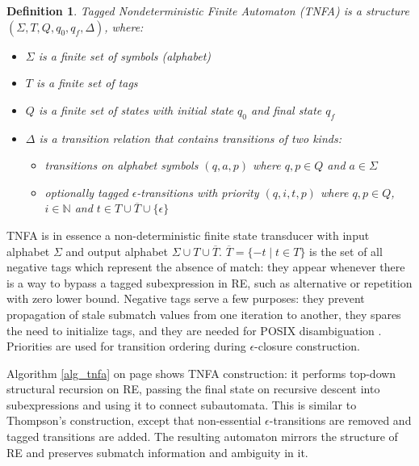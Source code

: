 \documentclass[]{article}
\newtheorem{definition}{Definition}
\newcommand*{\Xbar}[1]{\overline{#1}}
\newcommand{\YN}{\mathbb{N}}
\begin{document}
\begin{definition} \label{def_tnfa}
Tagged Nondeterministic Finite Automaton (TNFA)
is a structure $(\Sigma, T, Q, q_0, q_f, \Delta)$, where:
\begin{itemize}
    \item[] $\Sigma$ is a finite set of symbols (alphabet)
    \item[] $T$ is a finite set of tags
    \item[] $Q$ is a finite set of states with initial state $q_0$ and final state $q_f$
    \item[] $\Delta$ is a transition relation that contains transitions of two kinds:
    \begin{itemize}
        \item[] transitions on alphabet symbols $(q, a, p)$ where $q, p \in Q$ and $a \in \Sigma$
        \item[] optionally tagged $\epsilon$-transitions with priority $(q, i, t, p)$ where $q, p \in Q$, $i \in \YN$ and $t \in T \cup \Xbar{T} \cup \{\epsilon\}$
    \end{itemize}
\end{itemize}
\end{definition}

TNFA is in essence a non-deterministic finite state transducer with input alphabet $\Sigma$ and output alphabet $\Sigma \cup T \cup \Xbar{T}$.
$\Xbar{T} = \{-t \mid t \in T\}$ is the set of all negative tags which represent the absence of match: they appear whenever there is a way to bypass a tagged subexpression in RE,
such as alternative or repetition with zero lower bound.
Negative tags serve a few purposes:
they prevent propagation of stale submatch values from one iteration to another,
they spares the need to initialize tags,
and they are needed for POSIX disambiguation \cite{BorTro19}.
Priorities are used for transition ordering during $\epsilon$-closure construction.
\medskip

Algorithm \ref{alg_tnfa} on page \pageref{alg_tnfa} shows TNFA construction:
it performs top-down structural recursion on RE, passing the final state on recursive descent into subexpressions
and using it to connect subautomata.
This is similar to Thompson's construction, except that non-essential $\epsilon$-transitions are removed and tagged transitions are added.
The resulting automaton mirrors the structure of RE and preserves submatch information and ambiguity in it.
\end{document}

